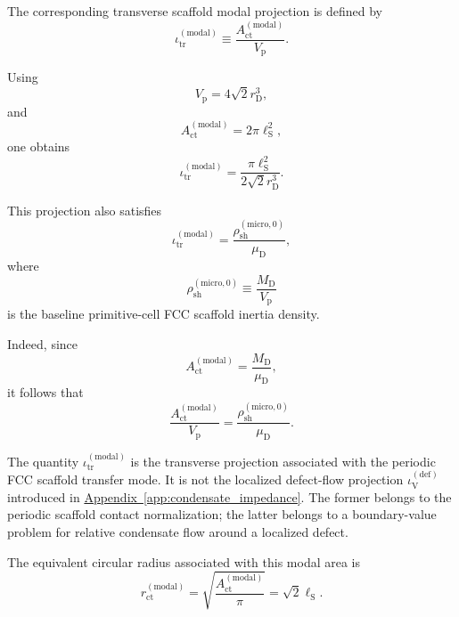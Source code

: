 The corresponding transverse scaffold modal projection is defined by
\begin{equation}
    \iota_{\mathrm{tr}}^{(\mathrm{modal})} \equiv \frac{A_{\mathrm{ct}}^{(\mathrm{modal})}}{V_{\mathrm{p}}}.
\end{equation}

Using
\begin{equation}
    V_{\mathrm{p}} = 4\sqrt{2}r_{\mathrm{D}}^3,
\end{equation}
and
\begin{equation}
    A_{\mathrm{ct}}^{(\mathrm{modal})} = 2\pi\ell_{\mathrm{S}}^2,
\end{equation}
one obtains
\begin{equation}
    \iota_{\mathrm{tr}}^{(\mathrm{modal})} = \frac{\pi\ell_{\mathrm{S}}^2}{2\sqrt{2}r_{\mathrm{D}}^3}.
\end{equation}

This projection also satisfies
\begin{equation}
    \iota_{\mathrm{tr}}^{(\mathrm{modal})} = \frac{\rho_{\mathrm{sh}}^{(\mathrm{micro},0)}}{\mu_{\mathrm{D}}},
\end{equation}
where
\begin{equation}
    \rho_{\mathrm{sh}}^{(\mathrm{micro},0)} \equiv \frac{M_{\mathrm{D}}}{V_{\mathrm{p}}}
\end{equation}
is the baseline primitive-cell FCC scaffold inertia density.

Indeed, since
\begin{equation}
    A_{\mathrm{ct}}^{(\mathrm{modal})} = \frac{M_{\mathrm{D}}}{\mu_{\mathrm{D}}},
\end{equation}
it follows that
\begin{equation}
    \frac{A_{\mathrm{ct}}^{(\mathrm{modal})}}{V_{\mathrm{p}}} = \frac{\rho_{\mathrm{sh}}^{(\mathrm{micro},0)}}{\mu_{\mathrm{D}}}.
\end{equation}

The quantity $\iota_{\mathrm{tr}}^{(\mathrm{modal})}$ is the transverse projection associated with the periodic FCC scaffold transfer mode. It is not the localized defect-flow projection $\iota_{\mathrm{V}}^{(\mathrm{def})}$ introduced in \hyperref[app:condensate_impedance]{Appendix~\ref*{app:condensate_impedance}}. The former belongs to the periodic scaffold contact normalization; the latter belongs to a boundary-value problem for relative condensate flow around a localized defect.

The equivalent circular radius associated with this modal area is
\begin{equation}
    r_{\mathrm{ct}}^{(\mathrm{modal})} = \sqrt{\frac{A_{\mathrm{ct}}^{(\mathrm{modal})}}{\pi}} = \sqrt{2}\ell_{\mathrm{S}}.
\end{equation}

